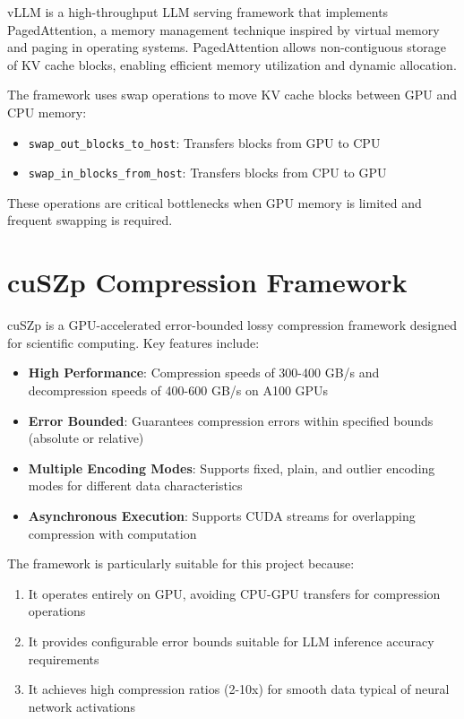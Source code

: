 \documentclass{polyu-comp}
\begin{document}
vLLM \cite{kwon2023efficient} is a high-throughput LLM serving framework that implements PagedAttention, a memory management technique inspired by virtual memory and paging in operating systems. PagedAttention allows non-contiguous storage of KV cache blocks, enabling efficient memory utilization and dynamic allocation.

The framework uses swap operations to move KV cache blocks between GPU and CPU memory:
\begin{itemize}
    \item \texttt{swap\_out\_blocks\_to\_host}: Transfers blocks from GPU to CPU
    \item \texttt{swap\_in\_blocks\_from\_host}: Transfers blocks from CPU to GPU
\end{itemize}

These operations are critical bottlenecks when GPU memory is limited and frequent swapping is required.

\section{cuSZp Compression Framework}
cuSZp \cite{huang2023cuszp} is a GPU-accelerated error-bounded lossy compression framework designed for scientific computing. Key features include:

\begin{itemize}
    \item \textbf{High Performance}: Compression speeds of 300-400 GB/s and decompression speeds of 400-600 GB/s on A100 GPUs
    \item \textbf{Error Bounded}: Guarantees compression errors within specified bounds (absolute or relative)
    \item \textbf{Multiple Encoding Modes}: Supports fixed, plain, and outlier encoding modes for different data characteristics
    \item \textbf{Asynchronous Execution}: Supports CUDA streams for overlapping compression with computation
\end{itemize}

The framework is particularly suitable for this project because:
\begin{enumerate}
    \item It operates entirely on GPU, avoiding CPU-GPU transfers for compression operations
    \item It provides configurable error bounds suitable for LLM inference accuracy requirements
    \item It achieves high compression ratios (2-10x) for smooth data typical of neural network activations
\end{enumerate}
\end{document}

